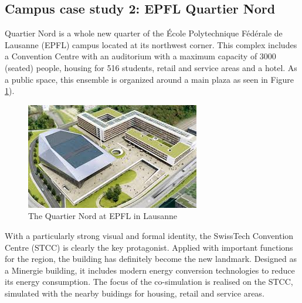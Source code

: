 \documentclass{tBPS2e}
\theoremstyle{plain}
\theoremstyle{definition}
\theoremstyle{remark}
\begin{document}



\subsection{Campus case study 2: EPFL Quartier Nord}
Quartier Nord is a whole new quarter of the École Polytechnique Fédérale de Lausanne (EPFL) campus located at its northwest corner. This complex includes a Convention Centre with an auditorium with a maximum capacity of 3000 (seated) people, housing for 516 students, retail and service areas and a hotel. As a public space, this ensemble is organized around a main plaza as seen in  Figure \ref{fig:quartier_nord_1}).

\begin{figure}[H]
\centering
\includegraphics[]{figures/quartier_nord_1}
\caption{The Quartier Nord at EPFL in Lausanne}
\label{fig:quartier_nord_1}
\end{figure}

With a particularly strong visual and formal identity, the SwissTech Convention Centre (STCC) is clearly the key protagonist. Applied with important functions for the region, the building has definitely become the new landmark. Designed as a Minergie building, it includes modern energy conversion technologies to reduce its energy consumption. The focus of the co-simulation is realised on the STCC, simulated with the nearby buidings for housing, retail and service areas.
\end{document}
